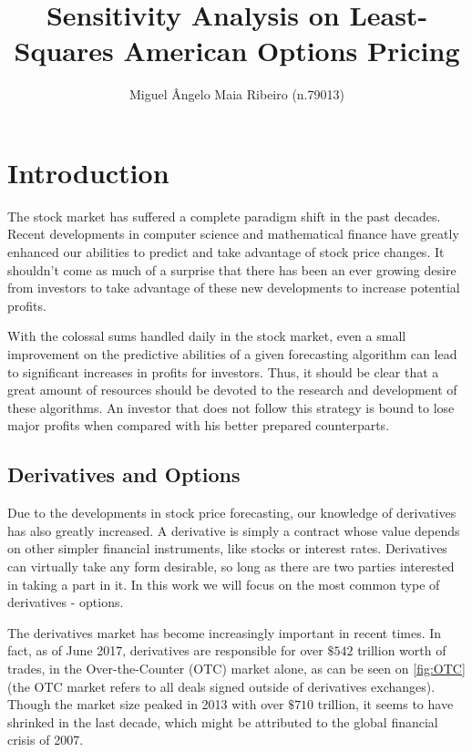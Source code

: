 \documentclass[a4paper,prd,twocolumn,nofootinbib,superscriptaddress,floatfix]{revtex4}
\begin{document}
\title{Sensitivity Analysis on Least-Squares American Options Pricing}

\author{Miguel Ângelo Maia Ribeiro (n.79013)}




\maketitle
\section{Introduction}
The stock market has suffered a complete paradigm shift in the past decades. Recent developments in computer science and mathematical finance have greatly enhanced our abilities to predict and take advantage of stock price changes. It shouldn't come as much of a surprise that there has been an ever growing desire from investors to take advantage of these new developments to increase potential profits.

With the colossal sums handled daily in the stock market, even a small improvement on the predictive abilities of a given forecasting algorithm can lead to significant increases in profits for investors. Thus, it should be clear that a great amount of resources should be devoted to the research and development of these algorithms. An investor that does not follow this strategy is bound to lose major profits when compared with his better prepared counterparts.




\subsection{Derivatives and Options}
Due to the developments in stock price forecasting, our knowledge of derivatives has also greatly increased. A derivative is simply a contract whose value depends on other simpler financial instruments, like stocks or interest rates. Derivatives can virtually take any form desirable, so long as there are two parties interested in taking a part in it. In this work we will focus on the most common type of derivatives - options.

The derivatives market has become increasingly important in recent times. In fact, as of June 2017, derivatives are responsible for over $\$542$ trillion worth of trades, in the Over-the-Counter (OTC) market alone, as can be seen on \autoref{fig:OTC} (the OTC market refers to all deals signed outside of derivatives exchanges). Though the market size peaked in 2013 with over $\$710$ trillion, it seems to have shrinked in the last decade, which might be attributed to the global financial crisis of 2007.
\end{document}
